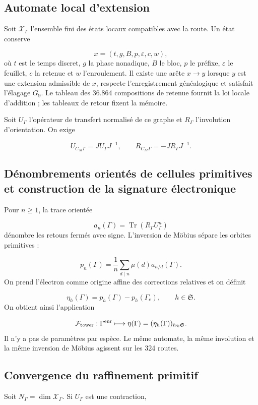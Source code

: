\subsection{Automate local d’extension}
Soit \(\mathscr X_\Gamma\) l’ensemble fini des états locaux compatibles avec la route. Un état conserve

\[
 x=(t,g,B,p,\varepsilon,c,w),
\]
où \(t\) est le temps discret, \(g\) la phase nonadique, \(B\) le bloc, \(p\) le préfixe, \(\varepsilon\) le feuillet, \(c\) la retenue et \(w\) l'enroulement. Il existe une arête \(x\to y\) lorsque \(y\) est une extension admissible de \(x\), respecte l'enregistrement généalogique et satisfait l'élagage \(G_9\). Le tableau des 36.864 compositions de retenue fournit la loi locale d'addition ; les tableaux de retour fixent la mémoire.

Soit \(U_\Gamma\) l’opérateur de transfert normalisé de ce graphe et \(R_\Gamma\) l’involution d’orientation. On exige

\[
 U_{C_M\Gamma}=J U_\Gamma J^{-1},\qquad
 R_{C_M\Gamma}=-J R_\Gamma J^{-1}.
\]
\subsection{Dénombrements orientés de cellules primitives et construction de la signature électronique}
Pour \(n\ge1\), la trace orientée

\[
 a_n(\Gamma)=\operatorname{Tr}(R_\Gamma U_\Gamma^n)
\]
dénombre les retours fermés avec signe. L’inversion de Möbius sépare les orbites primitives :

\[
 p_n(\Gamma)
 =\frac1n\sum_{d\mid n}\mu(d)a_{n/d}(\Gamma).
\]
On prend l’électron comme origine affine des corrections relatives et on définit

\[
 \boxed{
 \eta_h(\Gamma)=p_h(\Gamma)-p_h(\Gamma_e),
 \qquad h\in\mathfrak S.}
\]
On obtient ainsi l’application

\[
 \mathcal F_{\rm tower}:
 \Gamma^{\rm enr}\longmapsto
 \eta(\Gamma)=(\eta_h(\Gamma))_{h\in\mathfrak S}.
\]
Il n’y a pas de paramètres par espèce. Le même automate, la même involution et la même inversion de Möbius agissent sur les 324 routes.

\subsection{Convergence du raffinement primitif}
Soit \(N_\Gamma=\dim\mathscr X_\Gamma\). Si \(U_\Gamma\) est une contraction,

